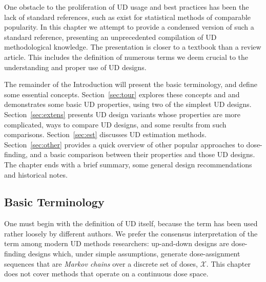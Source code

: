 One obstacle to the proliferation of UD usage and best practices has been the lack of standard references, such as exist for statistical methods of comparable popularity.  In this chapter we attempt to provide a condensed version of such a standard reference, presenting an unprecedented compilation of UD methodological knowledge. The presentation is closer to a textbook than a review article. This includes the definition of numerous terms we deem crucial to the understanding and proper use of UD designs.


The remainder of the Introduction will present the basic terminology, and define some essential concepts. Section~\ref{sec:tour} explores these concepts and and demonstrates some basic UD properties, using two of the simplest UD designs. Section~\ref{sec:extens} presents UD design variants whose properties are more complicated, ways to compare UD designs, and some results from such comparisons. Section~\ref{sec:est} discusses UD estimation methods. Section~\ref{sec:other} provides a quick overview of other popular approaches to dose-finding, and a basic comparison between their properties and those UD designs. The chapter ends with a brief summary, some general design recommendations and historical notes.

\subsection{Basic Terminology}\label{sec:terminol}

One must begin with the definition of UD itself, because the term has been used rather loosely by different authors. We prefer the consensus interpretation of the term among modern UD methods researchers: up-and-down designs are dose-finding designs which, under simple assumptions, generate dose-assignment sequences that are \emph{Markov chains} over a discrete set of doses, $\mathcal{X}$. This chapter does not cover methods that operate on a continuous dose space.

